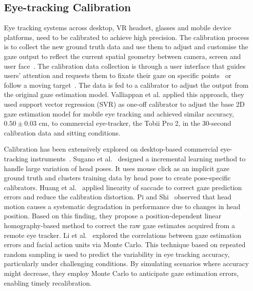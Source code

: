 \subsection{Eye-tracking Calibration}
Eye tracking systems across desktop, VR headset, glasses and mobile device platforms, need to be calibrated to achieve high precision. The calibration process is to collect the new ground truth data and use them to adjust and customise the gaze output to reflect the current spatial geometry between camera, screen and user face~\cite{lei2023end, duchowski2017eye}. The calibration data collection is through a user interface that guides users' attention and requests them to fixate their gaze on specific points~\cite{Drewes2019timecalibration,krafka2016eye, valliappan2020accelerating, huynh2021imon} or follow a moving target~\cite{lei2023DynamicRead,Drewes2019timecalibration}. 
The data is fed to a calibrator to adjust the output from the original gaze estimation model. Valliappan et al.\cite{valliappan2020accelerating} applied this approach, they used support vector regression (SVR) as one-off calibrator to adjust the base 2D gaze estimation model for mobile eye tracking and achieved similar accuracy, $0.50\pm0.03$ cm, to commercial eye-tracker, the Tobii Pro 2, in the 30-second calibration data and sitting conditions.

Calibration has been extensively explored on desktop-based commercial eye-tracking instruments~\cite{lei2023end}. Sugano et al.~\cite{Sugano08Incremental} designed a incremental learning method to handle large variation of head poses. It uses mouse click as an implicit gaze ground truth and clusters training data by head pose to create pose-specific calibrators. Huang et al.~\cite{huang2019saccalib} applied linearity of saccade to correct gaze prediction errors and reduce the calibration distortion. Pi and Shi~\cite{pi2019task} observed that head motion causes a systematic degradation in performance due to changes in head position. Based on this finding, they propose a position-dependent linear homography-based method to correct the raw gaze estimates acquired from a remote eye tracker. Li et al.~\cite{li2022calibration} explored the correlations between gaze estimation errors and facial action units via Monte Carlo.  This technique based on repeated random sampling is used to predict the variability in eye tracking accuracy, particularly under challenging conditions. By simulating scenarios where accuracy might decrease, they employ Monte Carlo to anticipate gaze estimation errors, enabling timely recalibration. 

